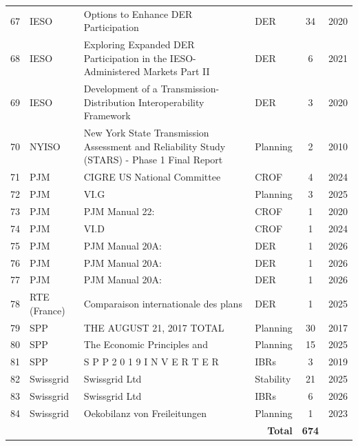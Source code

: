 {\begin{longtable}{c l p{5.5cm} l c c}
67 & IESO & Options to Enhance DER Participation & DER & 34 & 2020 \\
68 & IESO & Exploring Expanded DER Participation in the IESO-Administered Markets Part II & DER & 6 & 2021 \\
69 & IESO & Development of a Transmission-Distribution Interoperability Framework & DER & 3 & 2020 \\
70 & NYISO & New York State Transmission Assessment and Reliability Study (STARS) - Phase 1 Final Report & Planning & 2 & 2010 \\
71 & PJM & CIGRE US National Committee & CROF & 4 & 2024 \\
72 & PJM & VI.G & Planning & 3 & 2025 \\
73 & PJM & PJM Manual 22: & CROF & 1 & 2020 \\
74 & PJM & VI.D & CROF & 1 & 2024 \\
75 & PJM & PJM Manual 20A: & DER & 1 & 2026 \\
76 & PJM & PJM Manual 20A: & DER & 1 & 2026 \\
77 & PJM & PJM Manual 20A: & DER & 1 & 2026 \\
78 & RTE (France) & Comparaison internationale des plans & DER & 1 & 2025 \\
79 & SPP & THE AUGUST 21, 2017 TOTAL & Planning & 30 & 2017 \\
80 & SPP & The Economic Principles and & Planning & 15 & 2025 \\
81 & SPP & S P P 2 0 1 9 I N V E R T E R & IBRs & 3 & 2019 \\
82 & Swissgrid & Swissgrid Ltd & Stability & 21 & 2025 \\
83 & Swissgrid & Swissgrid Ltd & IBRs & 6 & 2026 \\
84 & Swissgrid & Oekobilanz von Freileitungen & Planning & 1 & 2023 \\
\midrule
    \multicolumn{4}{r}{\textbf{Total}} & \textbf{674} & \\
\bottomrule
\end{longtable}
}

